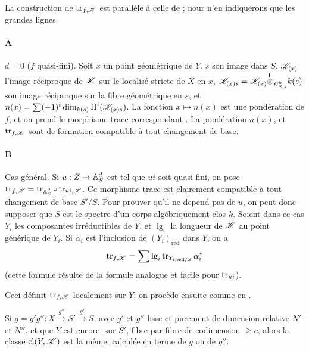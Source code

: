 \subsubsection{}\label{IV:2-3-4}

La construction de $\operatorname{tr}_{f,\mathscr{K}}$ est parall\`ele \`a celle de 
\cite[XVIII.2]{sga4}; nour n'en indiquerons que les grandes lignes.

\paragraph{A}
$d=0$ ($f$ quasi-fini). Soit $x$ un point g\'eom\'etrique de $Y$. $s$ son image 
dans $S$, $\mathscr{K}_{(x)}$ l'image r\'eciproque de $\mathscr{K}$ sur le localis\'e stricte 
de $X$ en $x$, $\mathscr{K}_{(x)s} = \mathscr{K}_{(x)}{\overset{\mathsf{L}}{\otimes}}_{\mathscr{O}_{S,s}^h} k(s)$ son image 
r\'eciproque sur la fibre g\'eom\'etrique en $s$, et 
$n(x)=\sum (-1)^i \dim_{k(s)} \operatorname{H}^i(\mathscr{K}_{(x)s})$. La fonction $x\mapsto n(x)$ 
est une pond\'eration de $f$, et on prend le morphisme trace correspondant 
\cite[XVII.6.2.5]{sga4}. La pond\'eration $n(x)$, et $\operatorname{tr}_{f,\mathscr{K}}$ sont de 
formation compatible \`a tout changement de base. 

\paragraph{B}
Cas g\'en\'eral. Si $u:Z\to \mathbb{A}_S^d$ est tel que $u i$ soit quasi-fini, on pose 
$\operatorname{tr}_{f,\mathscr{K}} = \operatorname{tr}_{\mathbb{A}_S^d}\circ \operatorname{tr}_{u i,\mathscr{K}}$. Ce morphisme trace est 
clairement compatible \`a tout changement de base $S'/S$. Pour prouver qu'il ne 
depend pas de $u$, on peut donc supposer que $S$ est le spectre d'un corps 
alg\'ebriquement clos $k$. Soient dans ce cas $Y_i$ les composantes 
irr\'eductibles de $Y$, et $\operatorname{lg}_i$ la longueur de $\mathscr{K}$ au 
point g\'en\'erique de $Y_i$. Si $\alpha_i$ est l'inclusion de 
$(Y_i)_\text{red}$ dans $Y$, on a 
\begin{equation}\label{IV:eq:2-3-4-1}
  \operatorname{tr}_{f,\mathscr{K}} = \sum \operatorname{lg}_i \operatorname{tr}_{Y_{i,\text{red}/S}} \alpha_i^\ast
\end{equation}
(cette formule r\'esulte de la formule analogue et facile pour $\operatorname{tr}_{u i}$). 

Ceci d\'efinit $\operatorname{tr}_{f,\mathscr{K}}$ localement sur $Y$; on proc\`ede ensuite comme en 
\cite[XVIII.2.9]{sga4}. 





\begin{lemma}\label{IV:2-3-5}
Si $g=g'g'':X\xrightarrow{g''} S'\xrightarrow{g'} S$, avec $g'$ et $g''$ lisse 
et purement de dimension relative $N'$ et $N''$, et que $Y$ est encore, sur 
$S'$, fibre par fibre de codimension $\geqslant c$, alors la classe 
$\operatorname{cl}(Y,\mathscr{K})$ est la m\^eme, calcul\'ee en terme de $g$ ou de 
$g''$.
\end{lemma}

